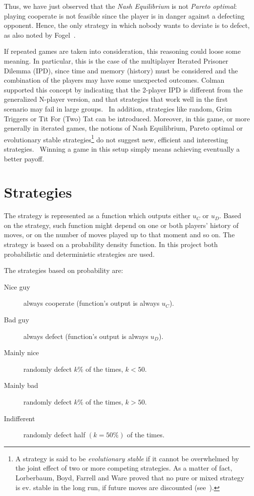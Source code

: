 \documentclass[journal,10pt,twoside]{IEEEtran}
\begin{document}
Thus, we have just observed that the \textit{Nash Equilibrium} is not \textit{Pareto optimal}: playing cooperate is not feasible since the player is in danger against a defecting opponent. Hence, the only strategy in which nobody wants to deviate is to defect, as also noted by Fogel~\cite{fogelEvolvingBehaviors}.

If repeated games are taken into consideration, this reasoning could loose some meaning. In particular, this is the case of the multiplayer Iterated Prisoner Dilemma (IPD), since time and memory (history) must be considered and the combination of the players may have some unexpected outcomes.
Colman supported this concept by indicating that the 2-player IPD is different from the generalized N-player version, and that strategies that work well in the first scenario may fail in large groups.~\cite{yao1994experimental}
In addition, strategies like random, Grim Triggers or Tit For (Two) Tat can be introduced.
Moreover, in this game, or more generally in iterated games, the notions of Nash Equilibrium, Pareto optimal or evolutionary stable strategies\footnote{A strategy is said to be \textit{evolutionary stable} if it cannot be overwhelmed by the joint effect of two or more competing strategies. As a matter of fact, Lorberbaum, Boyd, Farrell and Ware proved that no pure or mixed strategy is ev. stable in the long run, if future moves are discounted (see~\cite{lorb94}).} do not suggest new, efficient and interesting strategies.~\cite{mathieu2017}
Winning a game in this setup simply means achieving eventually a better payoff.

\section{Strategies} \label{s:str}
The strategy is represented as a function which outputs either $u_C$ or $u_D$. Based on the strategy, such function might depend on one or both players' history of moves, or on the number of moves played up to that moment and so on.
The strategy is based on a probability density function. In this project both probabilistic and deterministic strategies are used.

The strategies based on probability are:
\begin{description}
    \item[Nice guy] always cooperate (function's output is always $u_C$).
    \item[Bad guy] always defect (function's output is always $u_D$).
    \item[Mainly nice] randomly defect $k\%$ of the times, $k<50$.%
    \item[Mainly bad] randomly defect $k\%$ of the times, $k>50$.%
    \item[Indifferent] randomly defect half $(k=50\%)$ of the times.
\end{description}
\end{document}

